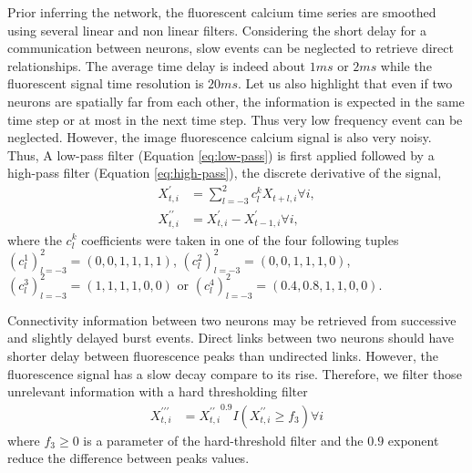 \documentclass[wcp]{jmlr}
\begin{document}
Prior inferring the network, the fluorescent calcium time series
are smoothed using several linear and non linear filters.
Considering the short delay for a communication between neurons, slow events
can be neglected to retrieve direct relationships. The average time
delay is indeed about $1ms$ or $2ms$ while the fluorescent signal time
resolution is $20ms$. Let us also highlight that even if two neurons are
spatially far from each other, the information is expected in the same time
step or at most in the next time step. Thus very low frequency event can be neglected.
However, the image fluorescence calcium signal is also very noisy. Thus,
A low-pass filter (Equation \ref{eq:low-pass}) is first applied followed by a
high-pass filter (Equation \ref{eq:high-pass}), the discrete derivative of
the signal,
\begin{align}
X^\prime_{t,i} &= \sum_{l=-3}^2 c_l^k X_{t+l,i} \forall i, \label{eq:low-pass}\\
X^{\prime\prime}_{t,i} &= X^{\prime}_{t,i} - X^{\prime}_{t-1,i} \forall i, \label{eq:high-pass}
\end{align}
where the $c_l^k$ coefficients were taken in one of the four
following tuples
$\left(c_l^1\right)_{l=-3}^2=(0, 0, 1, 1, 1, 1)$,
$\left(c_l^2\right)_{l=-3}^2=(0, 0, 1, 1, 1, 0)$,
$\left(c_l^3\right)_{l=-3}^2=(1, 1, 1, 1, 0, 0)$ or
$\left(c_l^4\right)_{l=-3}^2=(0.4, 0.8, 1, 1, 0, 0)$.

Connectivity information between two neurons may be retrieved from successive
and slightly delayed burst events. Direct links
between two neurons should have shorter delay between fluorescence
peaks than undirected links. However, the fluorescence signal has a slow
decay compare to its rise. Therefore, we filter those unrelevant information
with a hard thresholding filter
\begin{align}
X^{\prime\prime\prime}_{t,i} &=
{X^{\prime\prime}_{t,i}}^{0.9} I(X^{\prime\prime}_{t,i} \geq f_3) \forall i
\label{eq:hard-treshold-filter}
\end{align}
where $f_3 \geq 0$ is a parameter of the hard-threshold filter and the $0.9$
exponent reduce the difference between peaks values.
\end{document}
